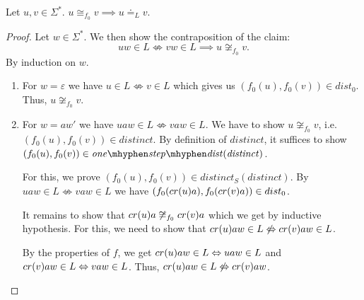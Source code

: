 \begin{lemma}
    \label{equiv_final}
    Let $u,v \in \Sigma^*$. 
    $u \cong_{f_0} v \implies u \doteq_L v$.
\end{lemma}
\begin{proof}
    Let $w \in \Sigma^*$. We then show the contraposition of the claim: 
    \begin{equation*}
        uw \in L \not\Leftrightarrow vw \in L \implies u \not\cong_{f_0} v.
    \end{equation*}    
    By induction on $w$.
    \begin{enumerate}
        \item For $w = \varepsilon$ we have $u \in L \not\Leftrightarrow v \in L$ which gives us $({f_0}(u),{f_0}(v)) \in dist_0$.
            Thus, $u \not\cong_{f_0} v$.
        \item For $w = aw'$ we have $uaw \in L \not\Leftrightarrow vaw \in L$.
            We have to show $u \not\cong_{f_0} v$, i.e. $({f_0}(u), {f_0}(v)) \in \mathit{distinct}$.
            By definition of $\mathit{distinct}$, it suffices to show $({f_0}(u), {f_0}(v)) \in \mathit{one\mhyphen step\mhyphen dist}(\mathit{distinct})$.

             For this, we prove $({f_0}(u), {f_0}(v)) \in \mathit{distinct_S}(\mathit{distinct})$. 
             By $uaw \in L \not\Leftrightarrow vaw \in L$ we have $({f_0}(cr(u)a), {f_0}(cr(v)a)) \in dist_0$.

             It remains to show that $cr(u)a \not\cong_{f_0} cr(v)a$ which we get by inductive hypothesis.
             For this, we need to show that $cr(u)aw \in L \not\Leftrightarrow cr(v)aw \in L$.

             By the properties of $f$, we get $cr(u)aw \in L \Leftrightarrow uaw \in L$ and $cr(v)aw \in L \Leftrightarrow vaw \in L$.
             Thus, $cr(u)aw \in L \not\Leftrightarrow cr(v)aw$.
             
    \end{enumerate}
\end{proof}


